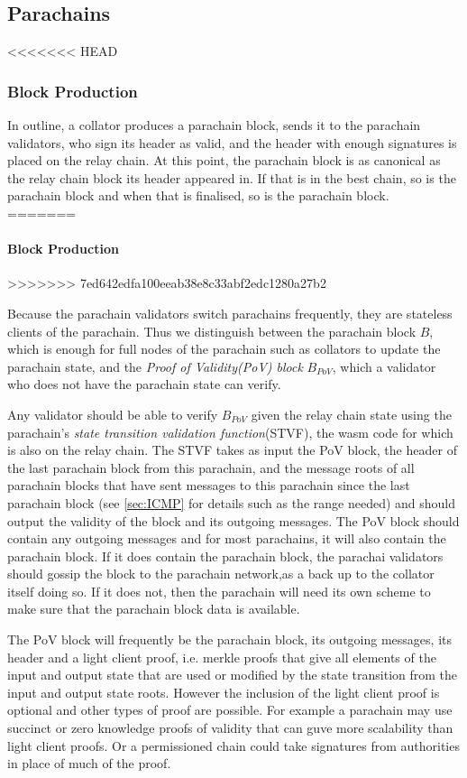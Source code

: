 \subsection{Parachains}
<<<<<<< HEAD
\subsubsection{Block Production}
In outline, a collator produces a parachain block, sends it to the parachain validators, who sign its header as valid, and the header with enough signatures is placed on the relay chain. At this point, the parachain block is as canonical as the relay chain block its header appeared in. If that is in the best chain, so is the parachain block and when that is finalised, so is the parachain block.
=======

\paragraph{Block Production}
>>>>>>> 7ed642edfa100eeab38e8c33abf2edc1280a27b2

Because the parachain validators switch parachains frequently, they are stateless clients of the parachain. Thus we distinguish between the parachain block $B$, which is enough for full nodes of the parachain such as collators to update the parachain state, and the {\em Proof of Validity(PoV) block} $B_{PoV}$, which a validator who does not have the parachain state can verify.

Any validator should be able to verify $B_{PoV}$ given the relay chain state using the parachain's {\em state transition validation function}(STVF), the wasm code for which is also on the relay chain. The STVF takes as input the PoV block, the header of the last parachain block from this parachain, and the message roots of all parachain blocks that have sent messages to this parachain since the last parachain block (see \ref{sec:ICMP} for details such as the range needed) and should output the validity of the block and its outgoing messages. The PoV block should contain any outgoing messages and for most parachains, it will also contain the parachain block. If it does contain the parachain block, the parachai validators should gossip the block to the parachain network,as a back up to the collator itself doing so. If it does not, then the parachain will need its own scheme to make sure that the parachain block data is available.

The PoV block will frequently be the parachain block, its outgoing messages, its header and a light client proof, i.e. merkle proofs that give all elements of the input and output state that are used or modified by the state transition from the input and output state roots. However the inclusion of the light client proof is optional and other types of proof are possible. For example a parachain may use succinct or zero knowledge proofs of validity that can guve more scalability than light client proofs. Or a permissioned chain could take signatures from authorities in place of much of the proof.

